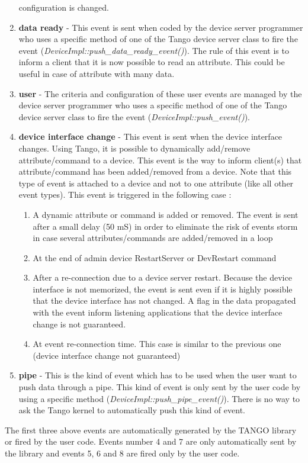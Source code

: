 \begin{enumerate}
configuration is changed.
\item \textbf{data ready} - This event is sent when coded by the device
server programmer who uses a specific method of one of the Tango device
server class to fire the event (\emph{DeviceImpl::push\_data\_ready\_event()}).
The rule of this event is to inform a client that it is now possible
to read an attribute. This could be useful in case of attribute with
many data.
\item \textbf{user} - The criteria and configuration of these user events
are managed by the device server programmer who uses a specific method
of one of the Tango device server class to fire the event (\emph{DeviceImpl::push\_event()}).
\item \textbf{device interface change} - This event is sent when the device
interface changes. Using Tango, it is possible to dynamically add/remove
attribute/command to a device. This event is the way to inform client(s)
that attribute/command has been added/removed from a device. Note
that this type of event is attached to a device and not to one attribute
(like all other event types). This event is triggered in the following
case :

\begin{enumerate}
\item A dynamic attribute or command is added or removed. The event is sent
after a small delay (50 mS) in order to eliminate the risk of events
storm in case several attributes/commands are added/removed in a loop 
\item At the end of admin device RestartServer or DevRestart command
\item After a re-connection due to a device server restart. Because the
device interface is not memorized, the event is sent even if it is
highly possible that the device interface has not changed. A flag
in the data propagated with the event inform listening applications
that the device interface change is not guaranteed. 
\item At event re-connection time. This case is similar to the previous
one (device interface change not guaranteed)
\end{enumerate}
\item \textbf{pipe} - This is the kind of event which has to be used when
the user want to push data through a pipe. This kind of event is only
sent by the user code by using a specific method (\emph{DeviceImpl::push\_pipe\_event()}).
There is no way to ask the Tango kernel to automatically push this
kind of event.
\end{enumerate}
The first three above events are automatically generated by the TANGO
library or fired by the user code. Events number 4 and 7 are only
automatically sent by the library and events 5, 6 and 8 are fired
only by the user code.


